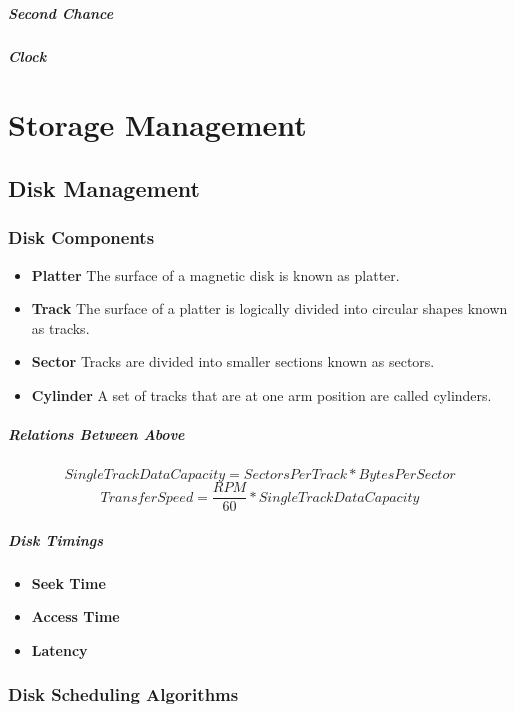 \paragraph{Second Chance}
\paragraph{Clock}

\chapter{Storage Management}
\section{Disk Management}
\subsection{Disk Components}
\begin{itemize}
\item \textbf{Platter} The surface of a magnetic disk is known as platter.
\item \textbf{Track} The surface of a platter is  logically divided into circular shapes known as tracks.
\item \textbf{Sector} Tracks are divided into smaller sections known as sectors.
\item \textbf{Cylinder} A set of tracks that are at one arm position are called cylinders.
\end{itemize}
\paragraph{Relations Between Above}
$$ SingleTrackDataCapacity = SectorsPerTrack * BytesPerSector $$
$$ TransferSpeed = \frac{RPM}{60} * SingleTrackDataCapacity $$
\paragraph{Disk Timings}
\begin{itemize}
	\item \textbf{Seek Time}
	\item \textbf{Access Time}
	\item \textbf{Latency}
\end{itemize}
\subsection{Disk Scheduling Algorithms}
